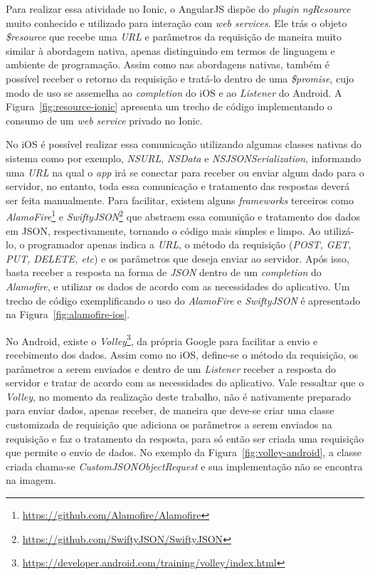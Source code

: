 Para realizar essa atividade no Ionic, o AngularJS dispõe do \textit{plugin ngResource} muito conhecido e utilizado para interação com \textit{web services}. Ele trás o objeto \textit{\$resource} que recebe uma 
\textit{URL} e parâmetros da requisição de maneira muito similar à abordagem nativa, apenas distinguindo em termos de linguagem e ambiente de programação. Assim como nas abordagens nativas, também é possível receber 
o retorno da requisição e tratá-lo dentro de uma \textit{\$promise}, cujo modo de uso se assemelha ao \textit{completion} do iOS e ao \textit{Listener} do Android. A Figura~\ref{fig:resource-ionic} apresenta um trecho 
de código implementando o consumo de um \textit{web service} privado no Ionic.

No iOS é possível realizar essa comunicação utilizando algumas classes nativas do sistema como por exemplo, \textit{NSURL}, \textit{NSData} e \textit{NSJSONSerialization}, informando uma \textit{URL} 
na qual o \textit{app} irá se conectar para receber ou enviar algum dado para o servidor, no entanto, toda essa comunicação e tratamento das respostas deverá ser feita manualmente. Para facilitar, existem alguns 
\textit{frameworks} terceiros como \textit{AlamoFire}\footnote{\url{https://github.com/Alamofire/Alamofire}} e \textit{SwiftyJSON}\footnote{\url{https://github.com/SwiftyJSON/SwiftyJSON}} 
que abstraem essa comunição e tratamento dos dados em JSON, respectivamente, tornando o código mais simples e limpo. Ao utilizá-lo, o programador apenas indica a \textit{URL}, o método da requisição 
(\textit{POST, GET, PUT, DELETE, etc}) e os parâmetros que deseja enviar ao servidor. Após isso, basta receber a resposta na forma de \textit{JSON} dentro de um \textit{completion} do \textit{Alamofire}, 
e utilizar os dados de acordo com as necessidades do aplicativo. Um trecho de código exemplificando o uso do \textit{AlamoFire} e \textit{SwiftyJSON} é apresentado na Figura~\ref{fig:alamofire-ios}.

No Android, existe o \textit{Volley}\footnote{\url{https://developer.android.com/training/volley/index.html}}, da própria Google para facilitar a envio e recebimento dos dados. Assim como no iOS, define-se o método da 
requisição, os parâmetros a serem enviados e dentro de um \textit{Listener} receber a resposta do servidor e tratar de acordo com as necessidades do aplicativo. Vale ressaltar que o \textit{Volley}, no momento da realização
deste trabalho, não é nativamente preparado para enviar dados, apenas receber, de maneira que deve-se criar uma classe customizada de requisição que adiciona os parâmetros a serem enviados na requisição e faz o tratamento da
resposta, para só então ser criada uma requisição que permite o envio de dados. No exemplo da Figura~\ref{fig:volley-android}, a classe criada chama-se \textit{CustomJSONObjectRequest} e sua implementação não se encontra 
na imagem.

